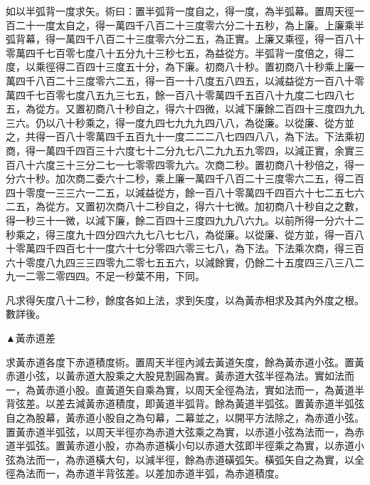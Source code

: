 如以半弧背一度求矢。術曰：置半弧背一度自之，得一度，為半弧幕。置周天徑一百二十一度太自之，得一萬四千八百二十三度零六分二十五秒，為上廉。上廉乘半弧背幕，得一萬四千八百二十三度零六分二五，為正實。上廉又乘徑，得一百八十零萬四千七百零七度八十五分九十三秒七五，為益從方。半弧背一度倍之，得二度，以乘徑得二百四十三度五十分，為下廉。初商八十秒。置初商八十秒乘上廉一萬四千八百二十三度零六二五，得一百一十八度五八四五，以減益從方一百八十零萬四千七百零七度八五九三七五，餘一百八十零萬四千五百八十九度二七四八七五，為從方。又置初商八十秒自之，得六十四微，以減下廉餘二百四十三度四九九三六。仍以八十秒乘之，得一度九四七九九九四八八，為從廉。以從廉、從方並之，共得一百八十零萬四千五百九十一度二二二八七四四八八，為下法。下法乘初商，得一萬四千四百三十六度七十二分九七八二九九五九零四，以減正實，余實三百八十六度三十三分二七一七零零四零九六。次商二秒。置初商八十秒倍之，得一分六十秒。加次商二委六十二秒，乘上廉一萬四千八百二十三度零六二五，得二百四十零度一三三六一二五，以減益從方，餘一百八十零萬四千四百六十七二五七六二五，為從方。又置初次商八十二秒自之，得六十七微。加初商八十秒自之之數，得一秒三十一微，以減下廉，餘二百四十三度四九九八六九。以前所得一分六十二秒乘之，得三度九十四分四六九七八七七八，為從廉。以從廉、從方並，得一百八十零萬四千四百七十一度六十七分零四六零三七八，為下法。下法乘次商，得三百六十零度八九四三三四零九二零七五五六，以減餘實，仍餘二十五度四三八三八二九一二零二零四四。不足一秒葉不用，下同。

凡求得矢度八十二秒，餘度各如上法，求到矢度，以為黃赤相求及其內外度之根。數詳後。

▲黃赤道差

求黃赤道各度下赤道積度術。置周天半徑內減去黃道矢度，餘為黃赤道小弦。置黃赤道小弦，以黃赤道大股乘之大股見割圓為實。黃赤道大弦半徑為法。實如法而一，為黃赤道小股。直黃道矢自乘為實，以周天全徑為法，實如法而一，為黃道半背弦差。以差去減黃赤道積度，即黃道半弧背。餘為黃道半弧弦。置黃赤道半弧弦自之為股幕，黃赤道小股自之為句幕，二幕並之，以開平方法除之，為赤道小弦。置黃赤道半弧弦，以周天半徑亦為赤道大弦乘之為實，以赤道小弦為法而一，為赤道半弧弦。置黃赤道小股，亦為赤道橫小句以赤道大弦即半徑乘之為實，以赤道小弦為法而一，為赤道橫大句，以減半徑，餘為赤道磺弧矢。橫弧矢自之為實，以全徑為法而一，為赤道半背弦差。以差加赤道半弧，為赤道積度。

